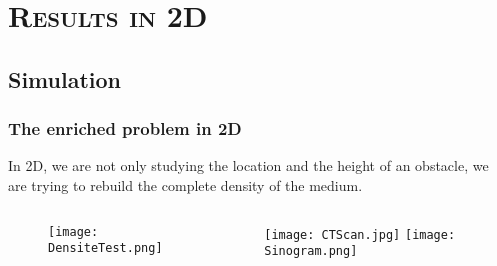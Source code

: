 


\section{\textsc{Results in 2D}}


\subsection{Simulation}


\begin{frame}
  \frametitle{The enriched problem in 2D}
  \begin{alertblock}{\vspace*{-3cm}}
    In 2D, we are not only studying the location and the height of an obstacle, we are trying to rebuild the complete density of the medium.     
  \end{alertblock}

  \begin{columns}
    \begin{column}{0.45\textwidth}
      \begin{center}
        \begin{figure}
        \texttt{[image: DensiteTest.png]}    %
        \end{figure}
    \end{center}
    \end{column}

    \pause

    \begin{column}{0.55\textwidth}
      \begin{center}
        \begin{figure}
        \texttt{[image: CTScan.jpg]}    %
        \texttt{[image: Sinogram.png]} 
        \end{figure}
    \end{center}
    \end{column}

  \end{columns}
\end{frame}


